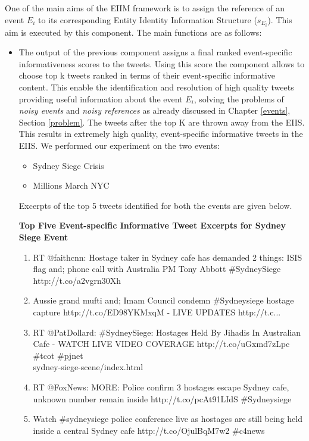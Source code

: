 One of the main aims of the EIIM framework is to assign the reference of an event $E_{i}$ to its corresponding Entity Identity Information Structure ($s_{E_{i}}$). This aim is executed by this component. The main functions are as follows:

\begin{itemize}
\item The output of the previous component assigns a final ranked event-specific informativeness scores to the tweets. Using this score the component allows to choose top k tweets ranked in terms of their event-specific informative content. This enable the identification and resolution of high quality tweets providing useful information about the event $E_{i}$, solving the problems of \textit{noisy events} and \textit{noisy references} as already discussed in Chapter \ref{events}, Section \ref{problem}. The tweets after the top K are thrown away from the EIIS. This results in extremely high quality, event-specific informative tweets in the EIIS. We performed our experiment on the two events:

\begin{itemize}
\item Sydney Siege Crisis
\item Millions March NYC
\end{itemize}

Excerpts of the top 5 tweets identified for both the events are given below.

\textbf{Top Five Event-specific Informative Tweet Excerpts for Sydney Siege Event}
\begin{enumerate}
\item RT @faithcnn: Hostage taker in Sydney cafe has demanded 2 things: ISIS flag and; phone call with Australia PM Tony Abbott \#SydneySiege http://t.co/a2vgrn30Xh
\item Aussie grand mufti and; Imam Council condemn \#Sydneysiege hostage capture http://t.co/ED98YKMxqM - LIVE UPDATES http://t.c...
\item RT @PatDollard: \#SydneySiege: Hostages Held By Jihadis In Australian Cafe - WATCH LIVE VIDEO COVERAGE http://t.co/uGxmd7zLpc \#tcot \#pjnet \\ sydney-siege-scene/index.html
\item RT @FoxNews: MORE: Police confirm 3 hostages escape Sydney cafe, unknown number remain inside http://t.co/pcAt91LIdS \#Sydneysiege
\item Watch \#sydneysiege police conference live as hostages are still being held inside a central Sydney cafe http://t.co/OjulBqM7w2 \#c4news
\end{enumerate}


\end{itemize}
